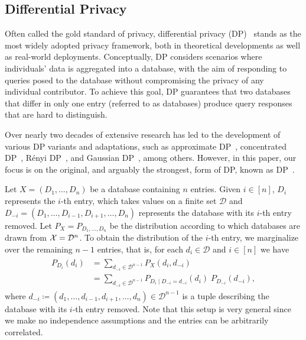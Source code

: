 \subsection{Differential Privacy}
Often called the gold standard of privacy, differential privacy (DP)~\cite{dworkCalibratingNoiseSensitivity,dwork2014algorithmic} stands as the most widely adopted privacy framework, both in theoretical developments as well as real-world deployments. Conceptually, DP considers scenarios where individuals' data is aggregated into a database, with the aim of responding to queries posed to the database without compromising the privacy of any individual contributor. To achieve this goal, DP guarantees that two databases that differ in only one entry (referred to as  databases) produce query responses that are hard to distinguish. 

Over nearly two decades of extensive research has led to the development of various DP variants and adaptations, such as approximate DP~\cite{dworkOurDataOurselves2006a}, concentrated DP~\cite{bun2016concentrated,dwork2016concentrated}, Rényi DP~\cite{mironov2017renyi}, and Gaussian DP~\cite{dong2022gaussian}, among others. However, in this paper, our focus is on the original, and arguably the strongest, form of DP, known as  DP~\cite{dworkCalibratingNoiseSensitivity}.

Let $X = (D_1, \ldots, D_n)$ be a database containing $n$ entries. Given $i \in [n]$, $D_i$ represents the $i$-th entry, which takes values on a finite set $\mathcal D$ and $D_{-i} = (D_1, \ldots, D_{i-1}, D_{i+1}, \ldots, D_n)$ represents the database with its $i$-th entry removed. Let $P_X = P_{D_1, \ldots, D_n}$ be the distribution according to which databases are drawn from $\mathcal{X} = \mathcal D^n$. To obtain the distribution of the $i$-th entry, we marginalize over the remaining $n-1$ entries, that is, for each $d_i \in \mathcal D$ and $i \in [n]$ we have
\begin{align}
\begin{split}
\label{eq:marginal}
    P_{D_i}(d_i) &= \sum_{d_{-i} \in \mathcal D^{n-1}} P_X(d_i, d_{-i})\\
    &= \sum_{d_{-i} \in \mathcal D^{n-1}} P_{D_i \mid D_{-i} = d_{-i}}(d_i) \; P_{D_{-i}} (d_{-i}),
\end{split}
\end{align}
where $d_{-i} \coloneqq (d_1, \ldots, d_{i-1}, d_{i+1}, \ldots, d_n) \in \mathcal D^{n-1}$ is a tuple describing the database with its $i$-th entry removed. Note that this setup is very general since we make no independence assumptions and the entries can be arbitrarily correlated. 

